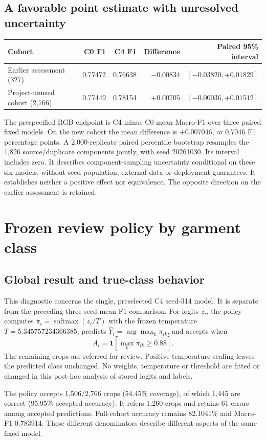 \subsection{A favorable point estimate with unresolved uncertainty}
\begin{center}\small
\setlength{\tabcolsep}{4pt}
\begin{tabular}{lrrrr}\toprule
Cohort & C0 F1 & C4 F1 & Difference & Paired 95\% interval\\\midrule
Earlier assessment (327) & 0.77472 & 0.76638 & $-0.00834$ & $[-0.03820,+0.01829]$\\
Project-unused cohort (2,766) & 0.77449 & 0.78154 & $+0.00705$ & $[-0.00036,+0.01512]$\\\bottomrule
\end{tabular}\end{center}
The prespecified RGB endpoint is C4 minus C0 mean Macro-F1 over three paired fixed models. On the new cohort the mean difference is $+0.007046$, or 0.7046 F1 percentage points. A 2,000-replicate paired percentile bootstrap resamples the 1,826 source/duplicate components jointly, with seed 20261030. Its interval includes zero. It describes component-sampling uncertainty conditional on these six models, without seed-population, external-data or deployment guarantees. It establishes neither a positive effect nor equivalence. The opposite direction on the earlier assessment is retained.

\clearpage
\section{Frozen review policy by garment class}\label{sec:policy-by-class}
\subsection{Global result and true-class behavior}
This diagnostic concerns the single, preselected C4 seed-314 model. It is separate from the preceding three-seed mean-F1 comparison. For logits $z_i$, the policy computes $\pi_i=\operatorname{softmax}(z_i/T)$ with the frozen temperature $T=5.345757234366385$, predicts $\hat Y_i=\arg\max_k\pi_{ik}$, and accepts when
\[
 A_i=\mathbf{1}\!\left[\max_k\pi_{ik}\geq0.88\right].
\]
The remaining crops are referred for review. Positive temperature scaling leaves the predicted class unchanged. No weights, temperature or threshold are fitted or changed in this post-hoc analysis of stored logits and labels.

The policy accepts 1,506/2,766 crops (54.45\% coverage), of which 1,445 are correct (95.95\% accepted accuracy). It refers 1,260 crops and retains 61 errors among accepted predictions. Full-cohort accuracy remains 82.1041\% and Macro-F1 0.783914. These different denominators describe different aspects of the same fixed model.

